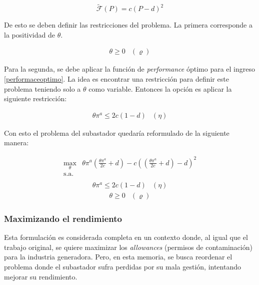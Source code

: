$$\tilde{\mathcal{F}}(P)=c(P-d)^2$$ 

De esto se deben definir las restricciones del problema. La primera corresponde a la positividad de $\theta$. 

\begin{equation}
\begin{array}{cl}
    \theta \geq 0 & (\varrho)\label{res:newsub1}
\end{array}
\end{equation}

Para la segunda, se debe aplicar la función de \textit{performance} óptimo para el ingreso \ref{performaceoptimo}. La idea es encontrar una restricción para definir este problema teniendo solo a $\theta$ como variable.  Entonces la opción es aplicar la siguiente restricción: 

\begin{equation}
\begin{array}{cl}
    \theta \pi^a\leq 2c(1-d) & (\eta) \label{res:newsub2}
\end{array}
\end{equation}

Con esto el problema del subastador quedaría reformulado de la siguiente manera:

\begin{equation}
\begin{array}{rrclcl}
    \displaystyle \max_{\theta} & \theta \pi^a(\frac{\theta \pi^a}{2c}+d) - c((\frac{\theta \pi^a}{2c}+d)-d)^2  \\\textrm{s.a.}\\
\end{array}
\end{equation}
\begin{equation}
\begin{array}{cl}
    \theta \pi^a\leq 2c(1-d) & (\eta) 
\end{array}
\end{equation}
\begin{equation}
\begin{array}{cl}
    \theta \geq 0 & (\varrho)
\end{array}
\end{equation}

\subsubsection{Maximizando el rendimiento}

Esta formulación es considerada completa en un contexto donde, al igual que el trabajo original, se quiere maximizar los \textit{allowances} (permisos de contaminación) para la industria generadora. Pero, en esta memoria, se busca reordenar el problema donde el subastador sufra perdidas por su mala gestión, intentando mejorar su rendimiento.
\vspace{2.5mm}

